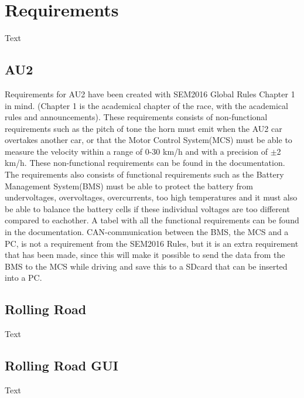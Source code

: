 \chapter{Requirements}
Text

\section{AU2}
Requirements for AU2 have been created with SEM2016 Global Rules Chapter 1 in mind. (Chapter 1 is the academical chapter of the race, with the academical rules and announcements). These requirements consists of non-functional requirements such as the pitch of tone the horn must emit when the AU2 car overtakes another car, or that the Motor Control System(MCS) must be able to measure the velocity within a range of 0-30 km/h and with a precision of $\pm$2 km/h. These non-functional requirements can be found in the documentation. The requirements also consists of functional requirements such as the Battery Management System(BMS) must be able to protect the battery from undervoltages, overvoltages, overcurrents, too high temperatures and it must also be able to balance the battery cells if these individual voltages are too different compared to eachother. A tabel with all the functional requirements can be found in the documentation. CAN-communication between the BMS, the MCS and a PC, is not a requirement from the SEM2016 Rules, but it is an extra requirement that has been made, since this will make it possible to send the data from the BMS to the MCS while driving and save this to a SDcard that can be inserted into a PC.

\section{Rolling Road}
Text

\section{Rolling Road GUI}
Text